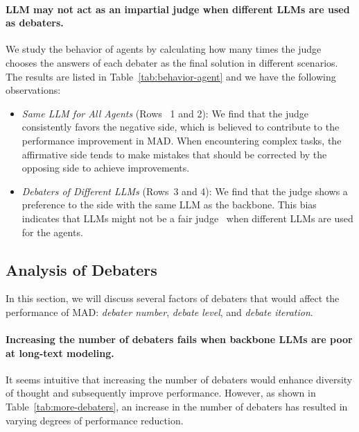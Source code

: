 \paragraph{LLM may not act as an impartial judge when different LLMs are used as debaters.}
We study the behavior of agents by calculating how many times the judge chooses the answers of each debater as the final solution in different scenarios. The results are listed in Table~\ref{tab:behavior-agent} and we have the following observations:
\begin{itemize}[leftmargin=10pt]
    \item \textit{Same  LLM for All Agents} (Rows ~\textcircled{\small{1}} and \textcircled{\small{2}}): We find that the judge consistently favors the negative side, which is believed to contribute to the performance improvement in MAD. When encountering complex tasks, the affirmative side tends to make mistakes that should be corrected by the opposing side to achieve improvements.
    \item \textit{Debaters of Different LLMs} (Rows~\textcircled{\small{3}} and \textcircled{\small{4}}): We find that the judge shows a preference to the side with the same LLM as the backbone. This bias indicates that
LLMs might not be a fair judge~\citep{wang2023FairEval} when different LLMs are used for the agents.
\end{itemize}




\subsection{Analysis of Debaters}

In this section, we will discuss several factors of debaters that would affect the performance of MAD: \textit{debater number}, \textit{debate level}, and \textit{debate iteration}.


\paragraph{Increasing the number of debaters fails when backbone LLMs are poor at long-text modeling.}
It seems intuitive that increasing the number of debaters would enhance diversity of thought and subsequently improve performance. However, as shown in Table~\ref{tab:more-debaters}, an increase in the number of debaters has resulted in varying degrees of performance reduction.

